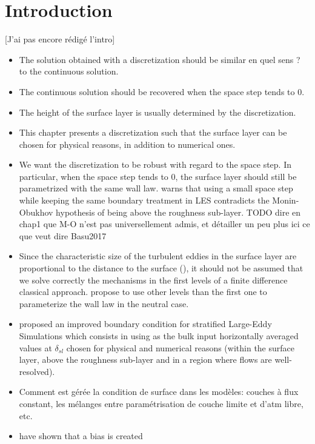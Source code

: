 \section{Introduction}
{\color{red} [J'ai pas encore rédigé l'intro]}
\begin{itemize}
\item The solution obtained with a discretization
	should be similar {\color{red} en quel sens ? }
		to the continuous solution.
\item The continuous solution should be recovered when
	the space step tends to 0.
\item The height of the surface layer
	is usually determined by the discretization.
\item This chapter presents a discretization such that
	the surface layer can be chosen for physical reasons,
	in addition to numerical ones.
\item We want the discretization to be robust with regard to
	the space step. In particular, when the space step
	tends to 0, the surface layer should still
	be parametrized with the same wall law.
	\cite{basu_cautionary_2017} warns that
	using a small space step while keeping
	the same boundary treatment in LES contradicts
		the Monin-Obukhov
	hypothesis of being above the roughness sub-layer.
		{\color{red} TODO dire en chap1 que M-O
		n'est pas universellement admis, et détailler
		un peu plus ici ce que veut dire Basu2017}
\item Since the characteristic
	size of the turbulent eddies in the surface layer are
		proportional to the distance to the surface (\cite{kawai_wall-modeling_2012}),
		it should not be assumed that we solve
		correctly the mechanisms in the first levels
		of a finite difference classical approach.
		\cite{kawai_wall-modeling_2012} propose to use other
		levels than the first one to parameterize the
		wall law in the neutral case.
	\item \cite{maronga_improved_2020} proposed an improved
		boundary condition for stratified Large-Eddy Simulations
		which consists in using as the bulk input
		horizontally averaged values at
		$\delta_{sl}$ chosen for physical and numerical
		reasons (within the surface layer, above the
		roughness sub-layer and in a region where flows are
		well-resolved).
\item Comment est gérée la condition de surface dans les modèles:
	couches à flux constant, les mélanges entre paramétrisation
	de couche limite et d'atm libre, etc.
\item \cite{nishizawa_surface_2018} have shown that a bias is created

\end{itemize}
